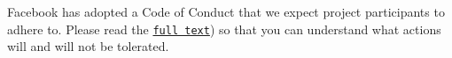 Facebook has adopted a Code of Conduct that we expect project participants to adhere to. Please read the \href{https://code.fb.com/codeofconduct/}{\tt full text}) so that you can understand what actions will and will not be tolerated. 